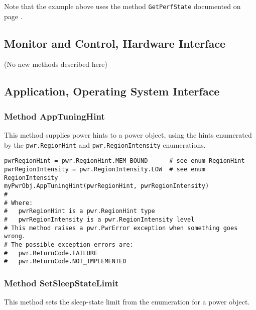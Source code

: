 Note that the example above uses the method \texttt{GetPerfState} documented on page
\pageref{meth:GetPerfState}.

\subsection{Monitor and Control, Hardware Interface}\label{sec:PythonMonitorControlInterface}
(No new methods described here)

\subsection{Application, Operating System Interface}\label{sec:PythonApplicationInterface}

\subsubsection{Method AppTuningHint} \label{meth:AppTuningHint}

This method supplies power hints to a power object, using the hints enumerated by the
\texttt{pwr.RegionHint} and \texttt{pwr.RegionIntensity} enumerations.

\begin{center}\begin{minipage}{.95\linewidth}\begin{lstlisting}
pwrRegionHint = pwr.RegionHint.MEM_BOUND      # see enum RegionHint
pwrRegionIntensity = pwr.RegionIntensity.LOW  # see enum RegionIntensity
myPwrObj.AppTuningHint(pwrRegionHint, pwrRegionIntensity)
#
# Where:
#   pwrRegionHint is a pwr.RegionHint type
#   pwrRegionIntensity is a pwr.RegionIntensity level
# This method raises a pwr.PwrError exception when something goes wrong.
# The possible exception errors are: 
#   pwr.ReturnCode.FAILURE
#   pwr.ReturnCode.NOT_IMPLEMENTED
\end{lstlisting}\end{minipage}\end{center}

\subsubsection{Method SetSleepStateLimit} \label{meth:SetSleepStateLimit}

This method sets the sleep-state limit from the enumeration for a power object.

